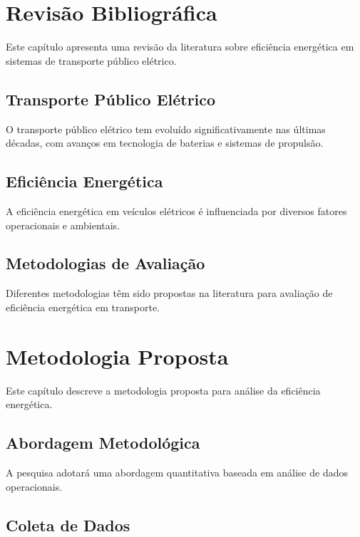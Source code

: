 \documentclass[qualificacao-mestrado,onehalfspacing,12pt,hyperref]{UnB-PPGT}
\begin{document}
\chapter{Revisão Bibliográfica}
\label{cap:revisao}

Este capítulo apresenta uma revisão da literatura sobre eficiência energética em sistemas de transporte público elétrico.

\section{Transporte Público Elétrico}
\label{sec:transporte}

O transporte público elétrico tem evoluído significativamente nas últimas décadas, com avanços em tecnologia de baterias e sistemas de propulsão.

\section{Eficiência Energética}
\label{sec:eficiencia}

A eficiência energética em veículos elétricos é influenciada por diversos fatores operacionais e ambientais.

\section{Metodologias de Avaliação}
\label{sec:metodologias}

Diferentes metodologias têm sido propostas na literatura para avaliação de eficiência energética em transporte.

\chapter{Metodologia Proposta}
\label{cap:metodologia}

Este capítulo descreve a metodologia proposta para análise da eficiência energética.

\section{Abordagem Metodológica}
\label{sec:abordagem}

A pesquisa adotará uma abordagem quantitativa baseada em análise de dados operacionais.

\section{Coleta de Dados}
\label{sec:coleta}
\end{document}
